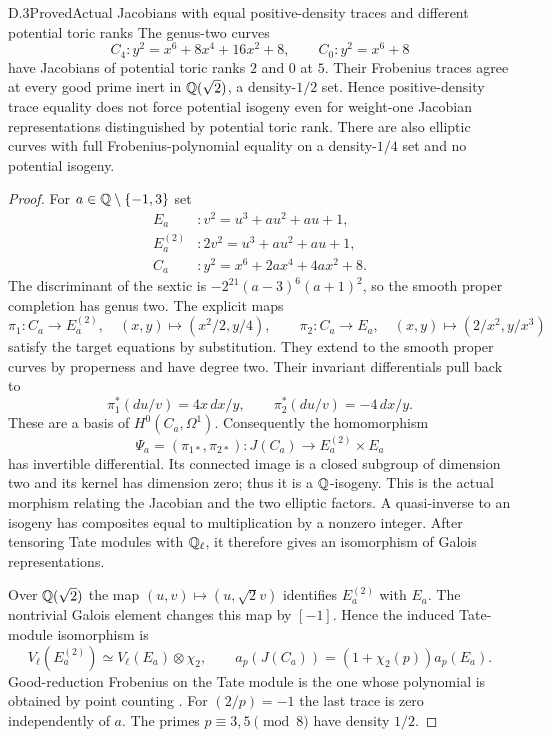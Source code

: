 \begin{statement}{D.3}{Proved}{Actual Jacobians with equal positive-density traces and different potential toric ranks}
The genus-two curves
\[
 C_4:y^2=x^6+8x^4+16x^2+8,
 \qquad C_0:y^2=x^6+8
 \tag{D.3.1}
\]
have Jacobians of potential toric ranks $2$ and $0$ at $5$.
Their Frobenius traces agree at every good prime inert in
$\mathbb Q(\sqrt2)$, a density-$1/2$ set. Hence positive-density trace
equality does not force potential isogeny even for weight-one
Jacobian representations distinguished by potential toric rank.
There are also elliptic curves with full Frobenius-polynomial
equality on a density-$1/4$ set and no potential isogeny.
\end{statement}
\begin{proof}
For $a\in\mathbb Q\setminus\{-1,3\}$ set
\[
 \begin{split}
 E_a &: v^2=u^3+a u^2+a u+1,\\
 E_a^{(2)} &: 2v^2=u^3+a u^2+a u+1,\\
 C_a &: y^2=x^6+2a x^4+4a x^2+8.
 \end{split}
\]
The discriminant of the sextic is
$-2^{21}(a-3)^6(a+1)^2$, so the smooth proper completion has
genus two. The explicit maps
\[
 \pi_1:C_a\longrightarrow E_a^{(2)},\quad
 (x,y)\longmapsto(x^2/2,y/4),
 \qquad
 \pi_2:C_a\longrightarrow E_a,\quad
 (x,y)\longmapsto(2/x^2,y/x^3)
 \tag{D.3.2}
\]
satisfy the target equations by substitution. They extend to
the smooth proper curves by properness and have degree two.
Their invariant differentials pull back to
\[
 \pi_1^*(du/v)=4x\,dx/y,
 \qquad
 \pi_2^*(du/v)=-4\,dx/y.
\]
These are a basis of $H^0(C_a,\Omega^1)$. Consequently the
homomorphism
\[
 \Psi_a=(\pi_{1*},\pi_{2*}):J(C_a)\longrightarrow
 E_a^{(2)}\times E_a
 \tag{D.3.3}
\]
has invertible differential. Its connected image is a closed
subgroup of dimension two and its kernel has dimension zero;
thus it is a $\mathbb Q$-isogeny. This is the actual morphism relating
the Jacobian and the two elliptic factors. A quasi-inverse to
an isogeny has composites equal to multiplication by a nonzero
integer. After tensoring Tate modules with $\mathbb Q_\ell$, it
therefore gives an isomorphism of Galois representations.

Over $\mathbb Q(\sqrt2)$ the map $(u,v)\mapsto(u,\sqrt2v)$ identifies
$E_a^{(2)}$ with $E_a$. The nontrivial Galois element changes
this map by $[-1]$. Hence the induced Tate-module isomorphism
is
\[
 V_\ell(E_a^{(2)})\simeq V_\ell(E_a)\otimes\chi_2,
 \qquad
 a_p(J(C_a))=(1+\chi_2(p))a_p(E_a).
 \tag{D.3.4}
\]
Good-reduction Frobenius on the Tate module is the one whose
polynomial is obtained by point counting
\cite[V, Propositions 8.1 and 8.3]{AgentMilneEC}.
For $(2/p)=-1$ the last trace is zero independently of $a$.
The primes $p\equiv3,5\pmod8$ have density $1/2$.


\end{proof}

